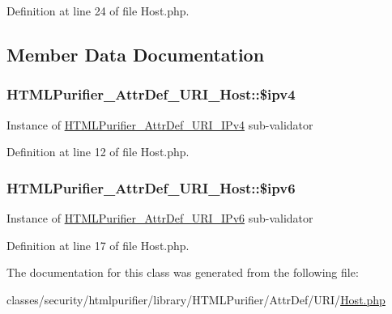 Definition at line 24 of file Host.\+php.



\subsection{Member Data Documentation}
\hypertarget{classHTMLPurifier__AttrDef__URI__Host_aa0291fa531c33d1826f218bf0b044179}{
\subsubsection[{\$ipv4}]{\setlength{\rightskip}{0pt plus 5cm}H\+T\+M\+L\+Purifier\+\_\+\+Attr\+Def\+\_\+\+U\+R\+I\+\_\+\+Host\+::\$ipv4\hspace{0.3cm}{\ttfamily [protected]}}}\label{classHTMLPurifier__AttrDef__URI__Host_aa0291fa531c33d1826f218bf0b044179}
Instance of \hyperlink{classHTMLPurifier__AttrDef__URI__IPv4}{H\+T\+M\+L\+Purifier\+\_\+\+Attr\+Def\+\_\+\+U\+R\+I\+\_\+\+I\+Pv4} sub-\/validator 

Definition at line 12 of file Host.\+php.

\hypertarget{classHTMLPurifier__AttrDef__URI__Host_add553d6766b9ad3438b858365f371c59}{
\subsubsection[{\$ipv6}]{\setlength{\rightskip}{0pt plus 5cm}H\+T\+M\+L\+Purifier\+\_\+\+Attr\+Def\+\_\+\+U\+R\+I\+\_\+\+Host\+::\$ipv6\hspace{0.3cm}{\ttfamily [protected]}}}\label{classHTMLPurifier__AttrDef__URI__Host_add553d6766b9ad3438b858365f371c59}
Instance of \hyperlink{classHTMLPurifier__AttrDef__URI__IPv6}{H\+T\+M\+L\+Purifier\+\_\+\+Attr\+Def\+\_\+\+U\+R\+I\+\_\+\+I\+Pv6} sub-\/validator 

Definition at line 17 of file Host.\+php.



The documentation for this class was generated from the following file\+:\begin{DoxyCompactItemize}
\item 
classes/security/htmlpurifier/library/\+H\+T\+M\+L\+Purifier/\+Attr\+Def/\+U\+R\+I/\hyperlink{Host_8php}{Host.\+php}\end{DoxyCompactItemize}
